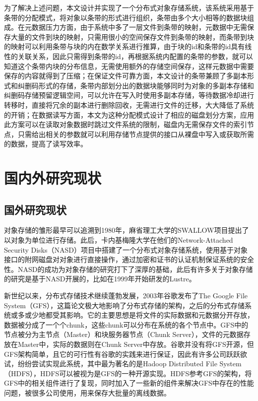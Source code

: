 为了解决上述问题，本文设计并实现了一个分布式对象存储系统，该系统采用基于条带的分配模式，将对象以条带的形式进行组织，条带由多个大小相等的数据块组成。在元数据压力方面，由于系统中多了一层文件到条带的映射，元数据中无需保存大量的文件到块的映射，只需用很小的空间保存文件到条带的映射，而条带到块的映射可以利用条带与块的内在数学关系进行推算，由于块的id和条带的id具有线性的关联关系，因此只需得到条带的id，再根据系统内配置的条带的参数，就可以知道这个条带内块的分布信息，无需使用额外的存储空间保存，这样元数据中需要保存的内容就得到了压缩；在保证文件可靠方面，本文设计的条带兼顾了多副本形式和纠删码形式的存储，条带内部划分出的数据块能够同时为对象的多副本存储和纠删码存储预留逻辑空间，可以允许在写入时使用多副本存储，等待数据冷却进行转移时，直接将冗余的副本进行删除回收，无需进行文件的迁移，大大降低了系统的开销；在数据读写方面，本文为这种分配模式设计了相应的磁盘划分方案，应用此方案可以在读取对象数据时跳过文件系统的限制，磁盘内无需保存文件的索引节点，只需给出相关的参数就可以利用存储节点提供的接口从裸盘中写入或获取所需的数据，提高了读写效率。

\section{国内外研究现状}%
\subsection{国外研究现状}%
对象存储的雏形最早可以追溯到1980年，麻省理工大学的SWALLOW项目提出了以对象为单位进行存储\cite{10}。此后，卡内基梅隆大学在他们的Network-Attached Security Disks\cite{11}（NASD）项目中搭建了一个分布式对象存储系统，使用基于对象接口的附网磁盘对对象进行直接操作，通过加密和证书的认证机制保证系统的安全性。NASD的成功为对象存储的研究打下了深厚的基础，此后有许多关于对象存储的研究是基于NASD开展的，比如在1999年开始研发的Lustre\cite{12}。

新世纪以来，分布式存储技术继续蓬勃发展，2003年谷歌发布了The Google File System\cite{13}（GFS），这篇论文极大地影响了分布式存储的架构，之后的分布式存储系统或多或少地都受其影响。它的主要思想是将文件的实际数据和元数据分开存放，数据被分成了一个个chunk，这些chunk可以分布在系统的各个节点中。GFS中的节点被分为主节点（Master）和块服务器节点（Chunk Server），文件的元数据存放在Master中，实际的数据则在Chunk Server中存放。谷歌并没有将GFS开源，但GFS架构简单，且它的可行性有谷歌的实践来进行保证，因此有许多公司跃跃欲试，纷纷尝试实现此系统，其中最为著名的是Hadoop Distributed File System\cite{14}（HDFS），HDFS可以被视为是GFS的一种开源实现。HDFS参考GFS的架构，将GFS中的相关组件进行了复现，同时加入了一些新的组件来解决GFS中存在的性能问题，被很多公司使用，用来保存大批量的离线数据。


